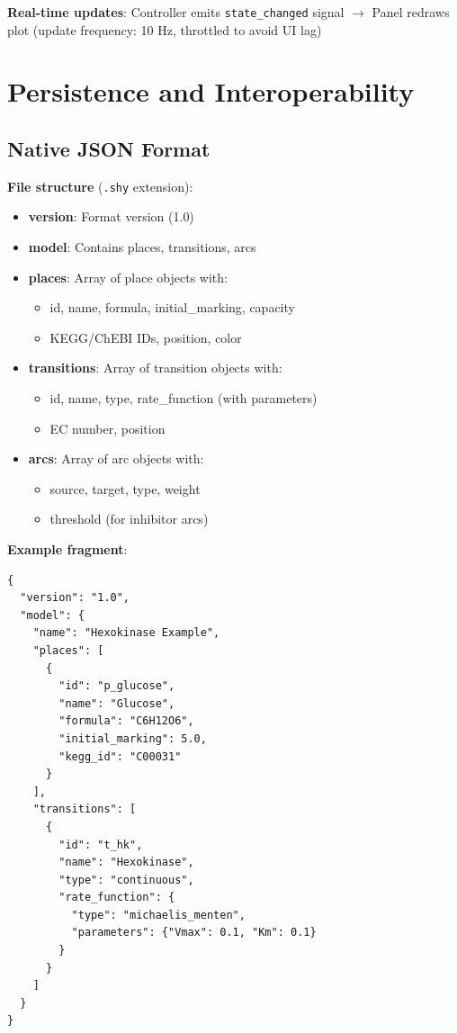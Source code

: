 \textbf{Real-time updates}: Controller emits \texttt{state\_changed} signal $\to$ Panel redraws plot (update frequency: 10 Hz, throttled to avoid UI lag)

\section{Persistence and Interoperability}
\label{sec:persistence}

\subsection{Native JSON Format}
\label{subsec:json-format}

\textbf{File structure} (\texttt{.shy} extension):

\begin{itemize}
    \item \textbf{version}: Format version (1.0)
    \item \textbf{model}: Contains places, transitions, arcs
    \item \textbf{places}: Array of place objects with:
    \begin{itemize}
        \item id, name, formula, initial\_marking, capacity
        \item KEGG/ChEBI IDs, position, color
    \end{itemize}
    \item \textbf{transitions}: Array of transition objects with:
    \begin{itemize}
        \item id, name, type, rate\_function (with parameters)
        \item EC number, position
    \end{itemize}
    \item \textbf{arcs}: Array of arc objects with:
    \begin{itemize}
        \item source, target, type, weight
        \item threshold (for inhibitor arcs)
    \end{itemize}
\end{itemize}

\textbf{Example fragment}:

\begin{verbatim}
{
  "version": "1.0",
  "model": {
    "name": "Hexokinase Example",
    "places": [
      {
        "id": "p_glucose",
        "name": "Glucose",
        "formula": "C6H12O6",
        "initial_marking": 5.0,
        "kegg_id": "C00031"
      }
    ],
    "transitions": [
      {
        "id": "t_hk",
        "name": "Hexokinase",
        "type": "continuous",
        "rate_function": {
          "type": "michaelis_menten",
          "parameters": {"Vmax": 0.1, "Km": 0.1}
        }
      }
    ]
  }
}
\end{verbatim}

